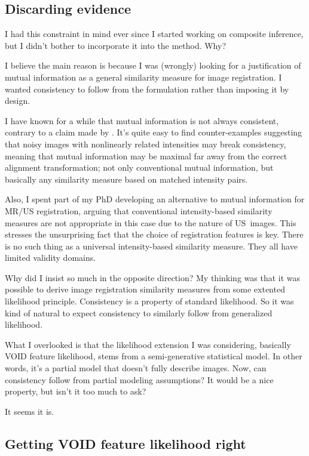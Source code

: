 \documentclass[english]{scrartcl}
\begin{document}
\subsection{Discarding evidence}

I had this constraint in mind ever since I started working on composite inference, but I didn't bother to incorporate it into the method. Why?

I believe the main reason is because I was (wrongly) looking for a justification of mutual information as a general similarity measure for image registration. I wanted consistency to follow from the formulation rather than imposing it by design.

I have known for a while that mutual information is not always consistent, contrary to a claim made by \cite{Zollei-09}. It's quite easy to find counter-examples suggesting that noisy images with nonlinearly related intensities may break consistency, meaning that mutual information may be maximal far away from the correct alignment transformation; not only conventional mutual information, but basically any similarity measure based on matched intensity pairs.

Also, I spent part of my PhD developing an alternative to mutual information for MR/US registration, arguing that conventional intensity-based similarity measures are not appropriate in this case due to the nature of US~images. This stresses the unsurprising fact that the choice of registration features is key. There is no such thing as a universal intensity-based similarity measure. They all have limited validity domains.

Why did I insist so much in the opposite direction? My thinking was that it was possible to derive image registration similarity measures from some extented likelihood principle. Consistency is a property of standard likelihood. So it was kind of natural to expect consistency to similarly follow from generalized likelihood.

What I overlooked is that the likelihood extension I was considering, basically VOID feature likelihood, stems from a semi-generative statistical model. In other words, it's a partial model that doesn't fully describe images. Now, can consistency follow from partial modeling assumptions? It would be a nice property, but isn't it too much to ask?

It seems it is.


\subsection{Getting VOID feature likelihood right}
\end{document}

